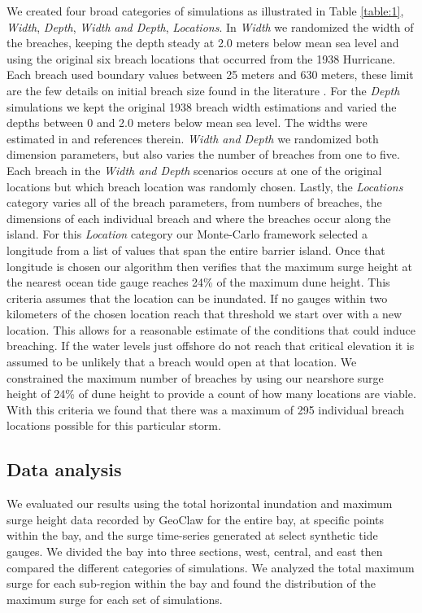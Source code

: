 \documentclass{coastal_paper}
\begin{document}
We created four broad categories of simulations as illustrated in Table \ref{table:1}, \emph{Width}, \emph{Depth}, \emph{Width and Depth}, \emph{Locations}. In \emph{Width} we randomized the width of the breaches, keeping the depth steady at 2.0 meters below mean sea level and using the original six breach locations that occurred from the 1938 Hurricane. Each breach used boundary values between 25 meters and 630 meters, these limit are the few details on initial breach size found in the literature \citep{Schmeltz1983Breach/InletInlet., Kraus2003a,Visser1999, Canizares2008}. For the \emph{Depth} simulations we kept the original 1938 breach width estimations and varied the depths between 0 and 2.0 meters below mean sea level. The widths were estimated in \citet{Canizares2008} and references therein. \emph{Width and Depth} we randomized both dimension parameters, but also varies the number of breaches from one to five. Each breach in the \emph{Width and Depth} scenarios occurs at one of the original locations but which breach location was randomly chosen. Lastly, the \emph{Locations} category varies all of the breach parameters, from numbers of breaches, the dimensions of each individual breach and where the breaches occur along the island.
For this \emph{Location} category our Monte-Carlo framework selected a longitude from a list of values that span the entire barrier island. Once that longitude is chosen our algorithm then verifies that the maximum surge height at the nearest ocean tide gauge reaches 24\% of the maximum dune height. This criteria assumes that the location can be inundated. If no gauges within two kilometers of the chosen location reach that threshold we start over with a new location. This allows for a reasonable estimate of the conditions that could induce breaching. If the water levels just offshore do not reach that critical elevation it is assumed to be unlikely that a breach would open at that location. We constrained the maximum number of breaches by using our nearshore surge height of 24\% of dune height to provide a count of how many locations are viable. With this criteria we found that there was a maximum of 295 individual breach locations possible for this particular storm.

\subsection{Data analysis}
We evaluated our results using the total horizontal inundation and maximum surge height data recorded by GeoClaw for the entire bay, at specific points within the bay, and the surge time-series generated at select synthetic tide gauges. We divided the bay into three sections, west, central, and east then compared the different categories of simulations. We analyzed the total maximum surge for each sub-region within the bay and found the distribution of the maximum surge for each set of simulations.
\end{document}
